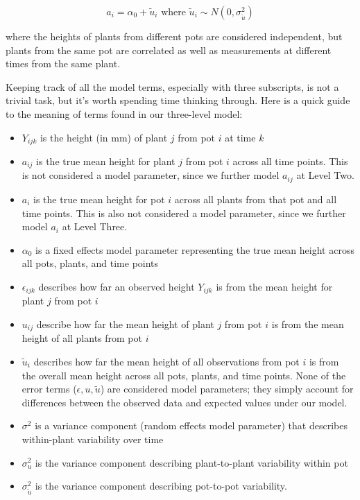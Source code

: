 \documentclass[
]{krantz}
\providecommand{\tightlist}{%
  \setlength{\itemsep}{0pt}\setlength{\parskip}{0pt}}
\begin{document}
\begin{equation*}
a_{i} = \alpha_{0}+\tilde{u}_{i} \textrm{ where } \tilde{u}_{i} \sim N(0,\sigma_{\tilde{u}}^{2})
\end{equation*}

where the heights of plants from different pots are considered independent, but plants from the same pot are correlated as well as measurements at different times from the same plant.

Keeping track of all the model terms, especially with three subscripts, is not a trivial task, but it's worth spending time thinking through. Here is a quick guide to the meaning of terms found in our three-level model:

\begin{itemize}
\tightlist
\item
  \(Y_{ijk}\) is the height (in mm) of plant \(j\) from pot \(i\) at time \(k\)
\item
  \(a_{ij}\) is the true mean height for plant \(j\) from pot \(i\) across all time points. This is not considered a model parameter, since we further model \(a_{ij}\) at Level Two.
\item
  \(a_{i}\) is the true mean height for pot \(i\) across all plants from that pot and all time points. This is also not considered a model parameter, since we further model \(a_{i}\) at Level Three.
\item
  \(\alpha_{0}\) is a fixed effects model parameter representing the true mean height across all pots, plants, and time points
\item
  \(\epsilon_{ijk}\) describes how far an observed height \(Y_{ijk}\) is from the mean height for plant \(j\) from pot \(i\)
\item
  \(u_{ij}\) describe how far the mean height of plant \(j\) from pot \(i\) is from the mean height of all plants from pot \(i\)
\item
  \(\tilde{u}_{i}\) describes how far the mean height of all observations from pot \(i\) is from the overall mean height across all pots, plants, and time points. None of the error terms (\(\epsilon, u, \tilde{u}\)) are considered model parameters; they simply account for differences between the observed data and expected values under our model.
\item
  \(\sigma^2\) is a variance component (random effects model parameter) that describes within-plant variability over time
\item
  \(\sigma_{u}^{2}\) is the variance component describing plant-to-plant variability within pot
\item
  \(\sigma_{\tilde{u}}^{2}\) is the variance component describing pot-to-pot variability.
\end{itemize}
\end{document}
